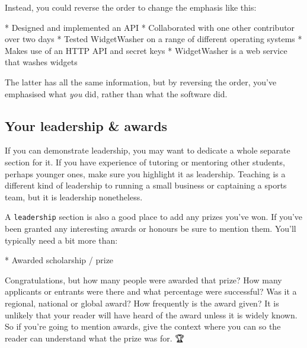\documentclass[
]{book}
\newenvironment{Shaded}{\begin{snugshade}}{\end{snugshade}}
\newcommand{\NormalTok}[1]{#1}
\newcommand{\SpecialStringTok}[1]{\textcolor[rgb]{0.31,0.60,0.02}{#1}}
\begin{document}
Instead, you could reverse the order to change the emphasis like this:

\begin{Shaded}
\begin{Highlighting}[]
\SpecialStringTok{* }\NormalTok{Designed and implemented an API}
\SpecialStringTok{* }\NormalTok{Collaborated with one other contributor over two days}
\SpecialStringTok{* }\NormalTok{Tested WidgetWasher on a range of different operating systems}
\SpecialStringTok{* }\NormalTok{Makes use of an HTTP API and secret keys}
\SpecialStringTok{* }\NormalTok{WidgetWasher is a web service that washes widgets}
\end{Highlighting}
\end{Shaded}

The latter has all the same information, but by reversing the order, you've emphasised what \emph{you} did, rather than what the software did. 💪

\hypertarget{prizes}{%
\subsection{Your leadership \& awards}\label{prizes}}

If you can demonstrate leadership, you may want to dedicate a whole separate section for it. If you have experience of tutoring or mentoring other students, perhaps younger ones, make sure you highlight it as leadership. Teaching is a different kind of leadership to running a small business or captaining a sports team, but it is leadership nonetheless.

A \texttt{leadership} section is also a good place to add any prizes you've won. If you've been granted any interesting awards or honours be sure to mention them. You'll typically need a bit more than:

\begin{Shaded}
\begin{Highlighting}[]
\SpecialStringTok{* }\NormalTok{Awarded scholarship / prize}
\end{Highlighting}
\end{Shaded}

Congratulations, but how many people were awarded that prize? How many applicants or entrants were there and what percentage were successful? Was it a regional, national or global award? How frequently is the award given? It is unlikely that your reader will have heard of the award unless it is widely known. So if you're going to mention awards, give the context where you can so the reader can understand what the prize was for. 🏆
\end{document}
